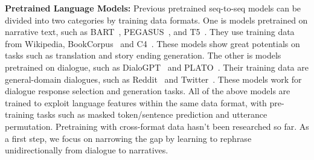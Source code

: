 




\textbf{Pretrained Language Models:} Previous pretrained seq-to-seq models can be divided into two categories by training data formats.
One is models pretrained on narrative text, such as BART~\cite{lewis2020bart}, PEGASUS~\cite{zhang2020pegasus}, and T5~\cite{raffel2020exploring}. They use training data from Wikipedia, BookCorpus~\cite{zhu2015aligning} and C4~\cite{raffel2020exploring}. These models show great potentials on tasks such as translation and story ending generation. %
The other is models pretrained on dialogue, such as DialoGPT~\cite{zhang2020dialogpt} and PLATO~\cite{bao2020plato}. Their training data are general-domain dialogues, such as Reddit~\cite{henderson2019repository} and Twitter~\cite{cho2014learning}. These models work for dialogue response selection and generation tasks. %
All of the above models are trained to exploit language features within the same data format, with pre-training tasks such as masked token/sentence prediction and utterance permutation.
Pretraining with cross-format data hasn't been researched so far. 
As a first step, we focus on narrowing the gap by learning to rephrase unidirectionally from dialogue to narratives.




